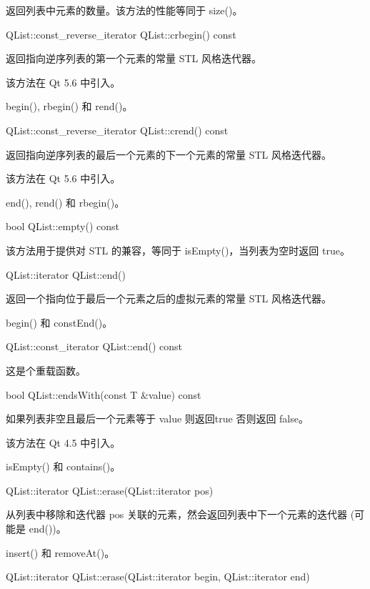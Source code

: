 返回列表中元素的数量。该方法的性能等同于 size()。

QList::const\_reverse\_iterator QList::crbegin() const

返回指向逆序列表的第一个元素的常量 STL 风格迭代器。

该方法在 Qt 5.6 中引入。

\begin{notice}[另请参阅]
begin(), rbegin() 和 rend()。
\end{notice}

QList::const\_reverse\_iterator QList::crend() const

返回指向逆序列表的最后一个元素的下一个元素的常量 STL 风格迭代器。

该方法在 Qt 5.6 中引入。

\begin{notice}[另请参阅]
end(), rend() 和 rbegin()。
\end{notice}

bool QList::empty() const

该方法用于提供对 STL 的兼容，等同于 isEmpty()，当列表为空时返回 true。

QList::iterator QList::end()

返回一个指向位于最后一个元素之后的虚拟元素的常量 STL 风格迭代器。

\begin{notice}[另请参阅]
begin() 和 constEnd()。
\end{notice}

QList::const\_iterator QList::end() const

这是个重载函数。

bool QList::endsWith(const T \&value) const

如果列表非空且最后一个元素等于 value 则返回true 否则返回 false。

该方法在 Qt 4.5 中引入。

\begin{notice}[另请参阅]
isEmpty() 和 contains()。
\end{notice}

QList::iterator QList::erase(QList::iterator pos)

从列表中移除和迭代器 pos 关联的元素，然会返回列表中下一个元素的迭代器 (可能是 end())。

\begin{notice}[另请参阅]
insert() 和 removeAt()。
\end{notice}

QList::iterator QList::erase(QList::iterator begin, QList::iterator end)

